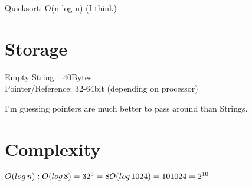 \documentclass[conference]{IEEEtran}%
\begin{document}
Quicksort: O(n log n) (I think)

\section{Storage}
Empty String: ~40Bytes\\
Pointer/Reference: 32-64bit (depending on processor)

I'm guessing pointers are much better to pass around than Strings.


\section{Complexity}
 $O(log\, n):\\O(log\, 8)=3\\2^3=8\\O(log\, 1024)=10\\1024=2^{10}$

%
\end{document}
